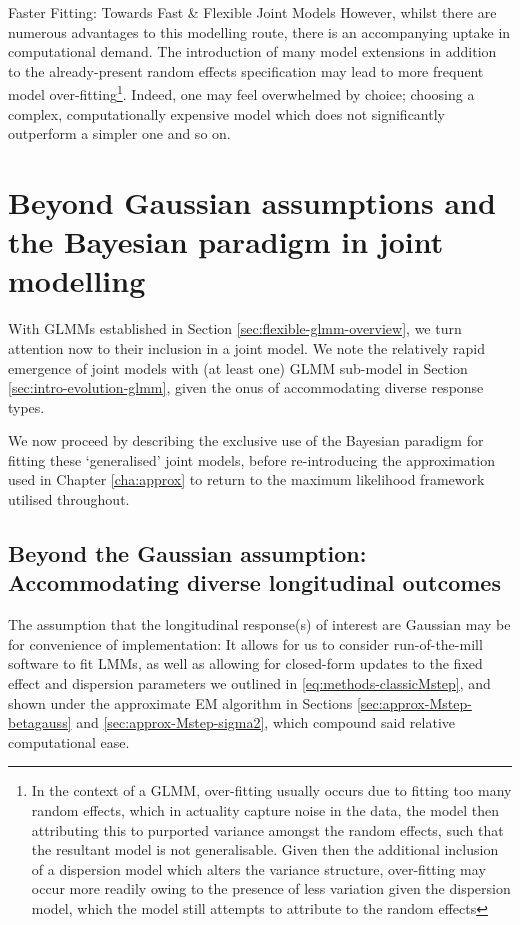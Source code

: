 \begin{chapter}{\label{cha:flexible}Faster Fitting: Towards Fast \& Flexible Joint Models}
However, whilst there are numerous advantages to this modelling route, there is an accompanying uptake in computational demand. The introduction of many model extensions in addition to the already-present random effects specification may lead to more frequent model over-fitting\footnote{In the context of a GLMM, over-fitting usually occurs due to fitting too many random effects, which in actuality capture noise in the data, the model then attributing this to purported variance amongst the random effects, such that the resultant model is not generalisable. Given then the additional inclusion of a dispersion model which alters the variance structure, over-fitting may occur more readily owing to the presence of less variation given the dispersion model, which the model still attempts to attribute to the random effects}. Indeed, one may feel overwhelmed by choice; choosing a complex, computationally expensive model which does not significantly outperform a simpler one and so on.

\section{Beyond Gaussian assumptions and the Bayesian paradigm in joint modelling}\label{sec:flexible-intro}
With GLMMs established in Section \ref{sec:flexible-glmm-overview}, we turn attention now to their inclusion in a joint model. We note the relatively rapid emergence of joint models with (at least one) GLMM sub-model in Section \ref{sec:intro-evolution-glmm}, given the onus of accommodating diverse response types. 

We now proceed by describing the exclusive use of the Bayesian paradigm for fitting these `generalised' joint models, before re-introducing the approximation used in Chapter \ref{cha:approx} to return to the maximum likelihood framework utilised throughout.

\subsection{Beyond the Gaussian assumption: Accommodating diverse longitudinal outcomes}\label{sec:flexible-intro-gaussian}
The assumption that the longitudinal response(s) of interest are Gaussian may be for convenience of implementation: It allows for us to consider run-of-the-mill software to fit LMMs, as well as allowing for closed-form updates to the fixed effect and dispersion parameters we outlined in \eqref{eq:methods-classicMstep}, and shown under the approximate EM algorithm in Sections \ref{sec:approx-Mstep-betagauss} and \ref{sec:approx-Mstep-sigma2}, which compound said relative computational ease.


\end{chapter}
